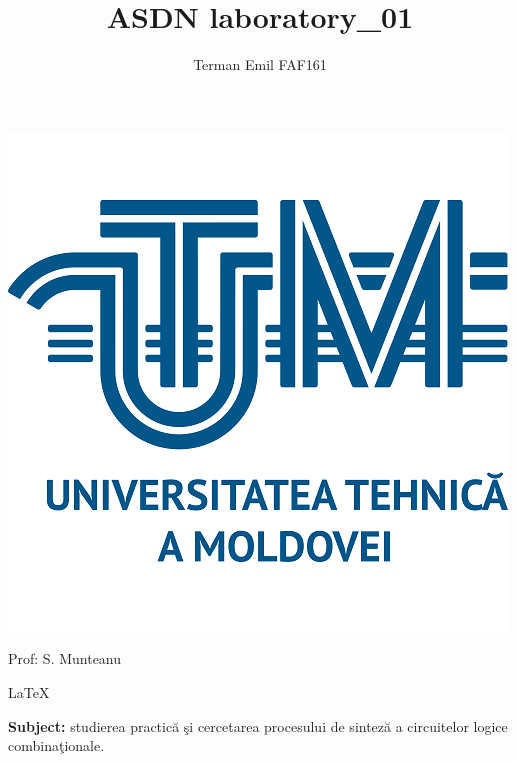 \documentclass{article}
\begin{document}

	\makeatletter
	\newenvironment{sqcases} {
		\matrix@check\sqcases\env@sqcases
	}{
		\endarray \right.
	}
	\def\env@sqcases {
		\let \@ifnextchar \new@ifnextchar
		\left \lbrack
		\def \arraystretch{1.2}
		\array{@{}l@{\quad}l@{}}
	}
	\makeatother


	\title{ASDN laboratory\_01}
	\author{Terman Emil FAF161}
	\maketitle

	\vspace*{\fill}
	
	\centering
	\includegraphics{imgs/UTM_logo.png}

	\begin{flushright}
		Prof: S. Munteanu
	\end{flushright}

	\LaTeX
	\pagebreak

	\raggedright
	{\large \textbf{Subject:}} studierea practică şi cercetarea procesului de sinteză a circuitelor logice combinaţionale.
	
\end{document}
